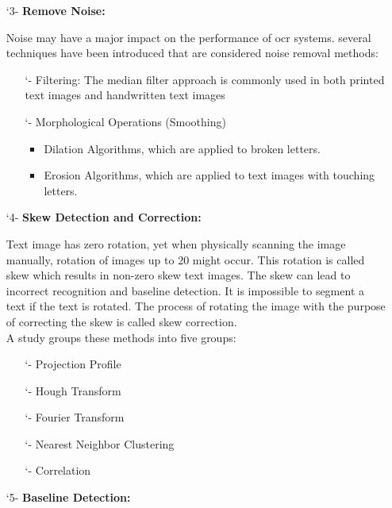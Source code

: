 \begin{itemize}[labelindent=1em,labelsep=0.25cm,leftmargin=*]
\begin{itemize}[labelindent=1em,labelsep=0.25cm,leftmargin=*]
        \item[\char `3-] \textbf{Remove Noise:}
        
        Noise may have a major impact on the performance of \acrshort{ocr} systems. several techniques have been introduced that are considered noise removal methods:
        \begin{itemize}[itemsep=1pt, topsep=5pt]
        \item[\char `-] Filtering: The median filter approach is commonly used in both printed text images and handwritten text images
        \item[\char `-] Morphological Operations (Smoothing)
            \begin{itemize}[itemsep=1pt, topsep=5pt]
            \item Dilation Algorithms, which are applied to broken letters.
            \item Erosion Algorithms, which are applied to text images with touching letters.
        \end{itemize} 
    \end{itemize} 
       
        \item[\char `4-] \textbf{Skew Detection and Correction:}
        
        Text image has zero rotation, yet when physically scanning the image manually, rotation of images up to 20 might occur. This rotation is called skew which results in non-zero skew text images.
        The skew can lead to incorrect recognition and baseline detection.
        It is impossible to segment a text if the text is rotated.
        The process of rotating the image with the purpose of correcting the skew is called skew correction. \\
        A study groups these methods into five groups:
        \begin{itemize}[itemsep=1pt, topsep=5pt]
        \item[\char `-] Projection Profile
        \item[\char `-] Hough Transform
        \item[\char `-] Fourier Transform
        \item[\char `-] Nearest Neighbor Clustering 
        \item[\char `-] Correlation
        \end{itemize} 

        \item[\char `5-] \textbf{Baseline Detection:}
        

\end{itemize}
\end{itemize}
